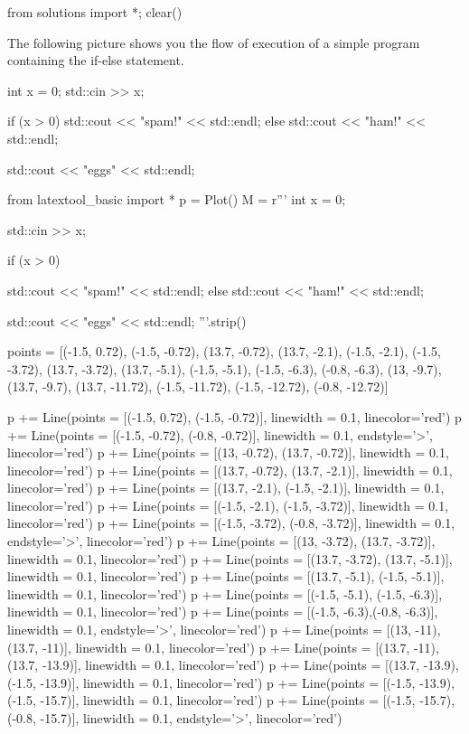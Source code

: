 \begin{python0}
from solutions import *; clear()
\end{python0}

The following picture shows you the flow of execution of a simple
program containing the if-else statement.
\begin{console}
int x = 0;
std::cin >> x;

if (x > 0)
   std::cout << "spam!" << std::endl;
else
   std::cout << "ham!" << std::endl;
   
std::cout << "eggs" << std::endl;
\end{console}
\begin{python}
from latextool_basic import *
p = Plot()
M = r'''
int x = 0;

std::cin >> x;
                                                                          
if (x > 0)

   std::cout << "spam!" << std::endl;   
else
   std::cout << "ham!" << std::endl;
   
std::cout << "eggs" << std::endl;
'''.strip()

points = [(-1.5, 0.72), (-1.5, -0.72), (13.7, -0.72), (13.7, -2.1), (-1.5, -2.1), (-1.5, -3.72), (13.7, -3.72), (13.7, -5.1), (-1.5, -5.1), (-1.5, -6.3), (-0.8, -6.3), (13, -9.7), (13.7, -9.7), (13.7, -11.72), (-1.5, -11.72), (-1.5, -12.72), (-0.8, -12.72)]

p += Line(points = [(-1.5, 0.72), (-1.5, -0.72)], linewidth = 0.1, linecolor='red')
p += Line(points = [(-1.5, -0.72), (-0.8, -0.72)], linewidth = 0.1, endstyle='>', linecolor='red')
p += Line(points = [(13, -0.72), (13.7, -0.72)], linewidth = 0.1, linecolor='red')
p += Line(points = [(13.7, -0.72), (13.7, -2.1)], linewidth = 0.1, linecolor='red')
p += Line(points = [(13.7, -2.1), (-1.5, -2.1)], linewidth = 0.1, linecolor='red')
p += Line(points = [(-1.5, -2.1), (-1.5, -3.72)], linewidth = 0.1, linecolor='red')
p += Line(points = [(-1.5, -3.72), (-0.8, -3.72)], linewidth = 0.1, endstyle='>', linecolor='red')
p += Line(points = [(13, -3.72), (13.7, -3.72)], linewidth = 0.1, linecolor='red')
p += Line(points = [(13.7, -3.72), (13.7, -5.1)], linewidth = 0.1, linecolor='red')
p += Line(points = [(13.7, -5.1), (-1.5, -5.1)], linewidth = 0.1, linecolor='red')
p += Line(points = [(-1.5, -5.1), (-1.5, -6.3)], linewidth = 0.1, linecolor='red')
p += Line(points = [(-1.5, -6.3),(-0.8, -6.3)], linewidth = 0.1, endstyle='>', linecolor='red')
p += Line(points = [(13, -11), (13.7, -11)], linewidth = 0.1, linecolor='red')
p += Line(points = [(13.7, -11), (13.7, -13.9)], linewidth = 0.1, linecolor='red')
p += Line(points = [(13.7, -13.9), (-1.5, -13.9)], linewidth = 0.1, linecolor='red')
p += Line(points = [(-1.5, -13.9), (-1.5, -15.7)], linewidth = 0.1, linecolor='red')
p += Line(points = [(-1.5, -15.7), (-0.8, -15.7)], linewidth = 0.1, endstyle='>', linecolor='red')



\end{python}
